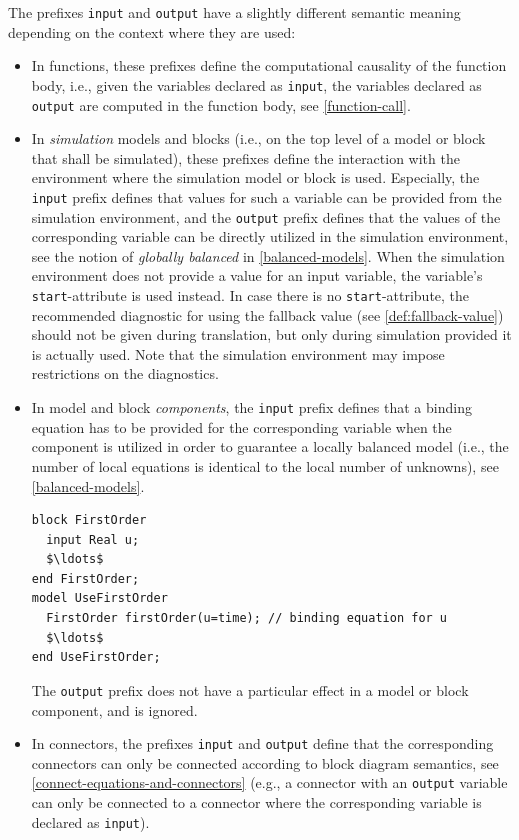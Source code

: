 The prefixes \lstinline!input! and \lstinline!output! have a slightly different semantic meaning depending on the context where they are used:
\begin{itemize}
\item
  In functions, these prefixes define the computational causality of the function body, i.e., given the variables declared as \lstinline!input!, the variables declared as \lstinline!output! are computed in the function body, see \cref{function-call}.
\item
  In \emph{simulation} models and blocks (i.e., on the top level of a model or block that shall be simulated), these prefixes define the interaction with the environment where the simulation model or block is used.
  Especially, the \lstinline!input! prefix defines that values for such a variable can be provided from the simulation environment, and the \lstinline!output! prefix defines that the values of the corresponding variable can be directly utilized in the simulation environment, see the notion of \emph{globally balanced} in \cref{balanced-models}.
  When the simulation environment does not provide a value for an input variable, the variable's \lstinline!start!-attribute is used instead.
  In case there is no \lstinline!start!-attribute, the recommended diagnostic for using the fallback value (see \cref{def:fallback-value}) should not be given during translation, but only during simulation provided it is actually used.
  Note that the simulation environment may impose restrictions on the diagnostics.
\item
  In model and block \emph{components}, the \lstinline!input! prefix defines that a binding equation has to be provided for the corresponding variable when the component is utilized in order to guarantee a locally balanced model (i.e., the number of local equations is identical to the local number of unknowns), see \cref{balanced-models}.
\begin{example}
\begin{lstlisting}[language=modelica]
block FirstOrder
  input Real u;
  $\ldots$
end FirstOrder;
model UseFirstOrder
  FirstOrder firstOrder(u=time); // binding equation for u
  $\ldots$
end UseFirstOrder;
\end{lstlisting}
\end{example}
  The \lstinline!output! prefix does not have a particular effect in a model or block component, and is ignored.
\item
  In connectors, the prefixes \lstinline!input! and \lstinline!output! define that the corresponding connectors can only be connected according to block diagram semantics, see \cref{connect-equations-and-connectors} (e.g., a connector with an \lstinline!output! variable can only be connected to a connector where the corresponding variable is declared as \lstinline!input!).

\end{itemize}
